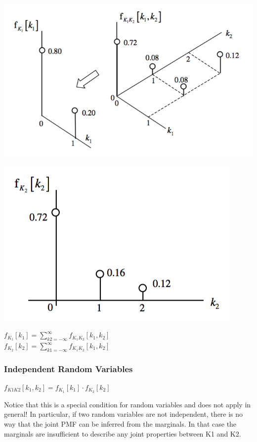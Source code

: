 \documentclass[11pt]{article}
\begin{document}
\begin{center}
    \includegraphics[width=300 px]{img/marginal} \\
\end{center}

\begin{center}
    \includegraphics[width=300 px]{img/marginal2} \\
\end{center}

\begin{center}
    $f_{K_1}[k_1] = \sum\limits_{k2=-\infty}^\infty f_{K_1K_2}[k_1,k_2]$ \\

    $f_{K_2}[k_2] = \sum\limits_{k1=-\infty}^\infty f_{K_1K_2}[k_1,k_2]$    
\end{center}


\subsubsection{Independent Random Variables}

\begin{center}
    $f_{K1K2}[k_1,k_2] = f_{K_1}[k_1]\cdot f_{K_2}[k_2]$
\end{center}

Notice that this is a special condition for random variables and does not apply in general! In particular, if two random variables are not independent, there is no way that the joint PMF can be inferred from the marginals. In that case the marginals are insufficient to describe any joint properties between K1 and K2.
\end{document}
